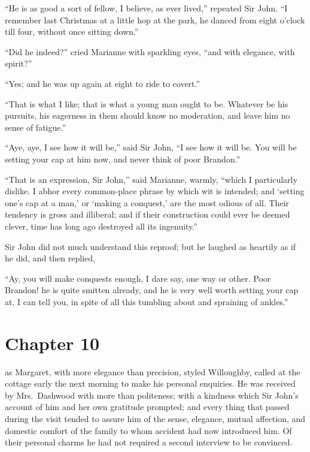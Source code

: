 ``He is as good a sort of fellow, I believe,
as ever lived,'' repeated Sir John.  ``I remember
last Christmas at a little hop at the park, he danced
from eight o'clock till four, without once sitting down.''

``Did he indeed?'' cried Marianne with sparkling eyes,
``and with elegance, with spirit?''

``Yes; and he was up again at eight to ride to covert.''

``That is what I like; that is what a young man ought
to be.  Whatever be his pursuits, his eagerness in them
should know no moderation, and leave him no sense of fatigue.''

``Aye, aye, I see how it will be,'' said Sir John, ``I see
how it will be.  You will be setting your cap at him now,
and never think of poor Brandon.''

``That is an expression, Sir John,'' said Marianne,
warmly, ``which I particularly dislike.  I abhor every
common-place phrase by which wit is intended; and `setting
one's cap at a man,' or `making a conquest,' are the most
odious of all.  Their tendency is gross and illiberal;
and if their construction could ever be deemed clever,
time has long ago destroyed all its ingenuity.''

Sir John did not much understand this reproof;
but he laughed as heartily as if he did, and then replied,

``Ay, you will make conquests enough, I dare say,
one way or other.  Poor Brandon! he is quite smitten already,
and he is very well worth setting your cap at, I can
tell you, in spite of all this tumbling about and spraining
of ankles.''



\chapter{Chapter 10}


 as Margaret, with more elegance
than precision, styled Willoughby, called at the cottage
early the next morning to make his personal enquiries.
He was received by Mrs.\ Dashwood with more than politeness;
with a kindness which Sir John's account of him and her own
gratitude prompted; and every thing that passed during
the visit tended to assure him of the sense, elegance,
mutual affection, and domestic comfort of the family
to whom accident had now introduced him.  Of their
personal charms he had not required a second interview
to be convinced.

